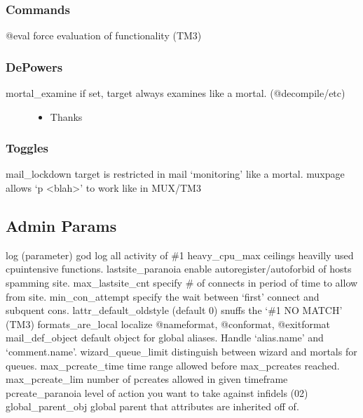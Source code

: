 \documentclass[letterpaper,10pt,english]{sphinxmanual}
\begin{document}
\subsubsection{Commands}
\label{\detokenize{changelog:id29}}
\sphinxAtStartPar
@eval \sphinxhyphen{} force evaluation of functionality (TM3)


\subsubsection{De\sphinxhyphen{}Powers}
\label{\detokenize{changelog:de-powers}}\begin{description}
\item[{mortal\_examine \sphinxhyphen{} if set, target always examines like a mortal. (@decompile/etc)}] \leavevmode\begin{itemize}
\item {} 
\sphinxAtStartPar
Thanks 

\end{itemize}

\end{description}


\subsubsection{Toggles}
\label{\detokenize{changelog:id30}}
\sphinxAtStartPar
mail\_lockdown \sphinxhyphen{} target is restricted in mail ‘monitoring’ like a mortal.
muxpage \sphinxhyphen{} allows ‘p \textless{}blah\textgreater{}’ to work like in MUX/TM3


\subsection{Admin Params}
\label{\detokenize{changelog:id31}}
\sphinxAtStartPar
log (parameter) god \sphinxhyphen{} log all activity of \#1
heavy\_cpu\_max \sphinxhyphen{} ceilings heavilly used cpu\sphinxhyphen{}intensive functions.
lastsite\_paranoia \sphinxhyphen{} enable auto\sphinxhyphen{}register/auto\sphinxhyphen{}forbid of hosts spamming site.
max\_lastsite\_cnt \sphinxhyphen{} specify \# of connects in period of time to allow from site.
min\_con\_attempt \sphinxhyphen{} specify the wait between ‘first’ connect and subquent cons.
lattr\_default\_oldstyle \sphinxhyphen{} (default 0) snuffs the ‘\#\sphinxhyphen{}1 NO MATCH’ (TM3)
formats\_are\_local \sphinxhyphen{} localize @nameformat, @conformat, @exitformat
mail\_def\_object \sphinxhyphen{} default object for global aliases. Handle ‘alias.name’ and ‘comment.name’.
wizard\_queue\_limit \sphinxhyphen{} distinguish between wizard and mortals for queues.
max\_pcreate\_time \sphinxhyphen{} time range allowed before max\_pcreates reached.
max\_pcreate\_lim \sphinxhyphen{} number of pcreates allowed in given timeframe
pcreate\_paranoia \sphinxhyphen{} level of action you want to take against infidels (0\sphinxhyphen{}2)
global\_parent\_obj \sphinxhyphen{} global parent that attributes are inherited off of.
\end{document}
